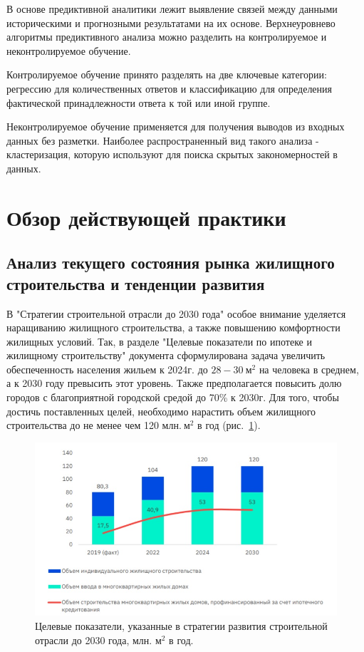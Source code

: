 \documentclass[12pt,a4paper]{article} %
\begin{document}
В основе предиктивной аналитики лежит выявление связей между данными историческими и прогнозными результатами на их основе. Верхнеуровнево алгоритмы предиктивного анализа можно разделить на контролируемое и неконтролируемое обучение\cite{Mohri}.

Контролируемое обучение принято разделять на две ключевые категории: регрессию для количественных ответов и классификацию для определения фактической принадлежности ответа к той или иной группе. 
 
Неконтролируемое обучение применяется для получения выводов из входных данных без разметки. Наиболее распространенный вид такого анализа - кластеризация, которую используют для поиска скрытых закономерностей в данных.


\newpage
\section{Обзор действующей практики}
\subsection{Анализ текущего состояния рынка жилищного строительства и тенденции развития}

В "Стратегии строительной отрасли до 2030 года"\cite{Asso} особое внимание уделяется наращиванию жилищного строительства, а также повышению комфортности жилищных условий. Так, в разделе "Целевые показатели по ипотеке и жилищному строительству" документа сформулирована задача увеличить обеспеченность населения жильем к 2024г. до $28-30~\text{м}^2$ на человека в среднем, а к 2030 году превысить этот уровень. Также предполагается повысить долю городов с благоприятной городской средой до 70\% к 2030г. Для того, чтобы достичь поставленных целей, необходимо нарастить объем жилищного строительства до не менее чем 120 млн.$~\text{м}^2$ в год (рис.~\ref{fig:develop_dynam}).

\begin{figure}[h]
	
	\centering
	
	\includegraphics[width=0.7\linewidth]{develop_dynam.jpg}
	
	\caption{Целевые показатели, указанные в стратегии развития строительной  \newline отрасли до 2030 года, млн. $\text{м}^2$ в год.}
	
	\label{fig:develop_dynam}
	
\end{figure}
\end{document}

